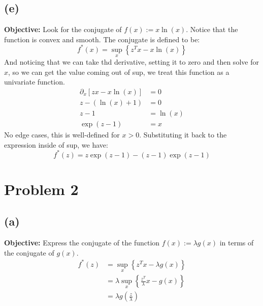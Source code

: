 \documentclass[]{article}
\begin{document}
    \subsection*{(e)}
        \textbf{Objective: }Look for the conjugate of $f(x):= x\ln(x)$. Notice that the function is convex and smooth. The conjugate is defined to be: 
        $$
        f^*(x) = \sup_x \left\lbrace
        z^Tx - x\ln(x)
        \right\rbrace
        $$
        And noticing that we can take thd derivative, setting it to zero and then solve for $x$, so we can get the value coming out of sup, we treat this function as a univariate function. 
        \begin{align*}\tag{1e1}\label{eqn:1e1}
            \partial_x[zx - x\ln(x)] &= 0
            \\
            z - (\ln(x) + 1) &= 0
            \\
            z - 1 &= \ln(x)
            \\
            \exp(z - 1) &= x
        \end{align*}
        No edge cases, this is well-defined for $x > 0$. 
        Substituting it back to the expression inside of sup, we have: 
        $$
        f^*(z) = z\exp(z - 1) - (z - 1)\exp(z - 1)
        $$
\section*{Problem 2}
    \subsection*{(a)}
        \textbf{Objective: }Express the conjugate of the function $f(x):= \lambda g(x)$ in terms of the conjugate of $g(x)$. 
        \begin{align*}\tag{2a1}\label{eqn:2a1}
        f^*(z) &= \sup_x \left\lbrace
            z^Tx - \lambda g(x)
        \right\rbrace
        \\
        &= \lambda \sup_x \left\lbrace
            \frac{z^T}{\lambda}x - g(x)
        \right\rbrace
        \\ 
        &= \lambda g \left(
            \frac{z}{\lambda}
        \right)
        \end{align*}
\end{document}
